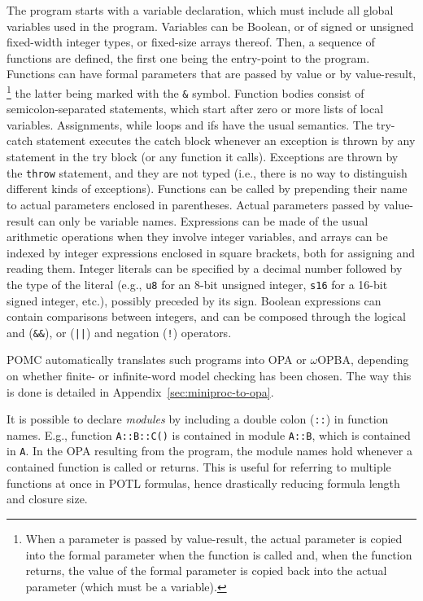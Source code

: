 \documentclass[9pt,a4paper]{article}
\begin{document}
The program starts with a variable declaration, which must include all global variables used in the program.
Variables can be Boolean, or of signed or unsigned fixed-width integer types,
or fixed-size arrays thereof.
Then, a sequence of functions are defined, the first one being the entry-point to the program.
Functions can have formal parameters that are passed by value or by value-result,%
\footnote{When a parameter is passed by value-result, the actual parameter is copied into
the formal parameter when the function is called and,
when the function returns, the value of the formal parameter
is copied back into the actual parameter (which must be a variable).}
the latter being marked with the \texttt{\&} symbol.
Function bodies consist of semicolon-separated statements,
which start after zero or more lists of local variables.
Assignments, while loops and ifs have the usual semantics.
The try-catch statement executes the catch block whenever an exception is thrown by any statement
in the try block (or any function it calls).
Exceptions are thrown by the \texttt{throw} statement, and they are not typed
(i.e., there is no way to distinguish different kinds of exceptions).
Functions can be called by prepending their name to actual parameters enclosed in parentheses.
Actual parameters passed by value-result can only be variable names.
Expressions can be made of the usual arithmetic operations when they involve integer variables,
and arrays can be indexed by integer expressions enclosed in square brackets,
both for assigning and reading them.
Integer literals can be specified by a decimal number followed by the type of the literal
(e.g., \texttt{u8} for an 8-bit unsigned integer,
\texttt{s16} for a 16-bit signed integer, etc.),
possibly preceded by its sign.
Boolean expressions can contain comparisons between integers,
and can be composed through the logical and (\texttt{\&\&}),
or (\texttt{||}) and negation (\texttt{!}) operators.

POMC automatically translates such programs into OPA or $\omega$OPBA,
depending on whether finite- or infinite-word model checking has been chosen.
The way this is done is detailed in Appendix~\ref{sec:miniproc-to-opa}.

It is possible to declare \emph{modules} by including a double colon (\texttt{::})
in function names. E.g., function \texttt{A::B::C()} is contained in module \texttt{A::B},
which is contained in \texttt{A}. In the OPA resulting from the program, the module
names hold whenever a contained function is called or returns.
This is useful for referring to multiple functions at once in POTL formulas, hence drastically
reducing formula length and closure size.
\end{document}
